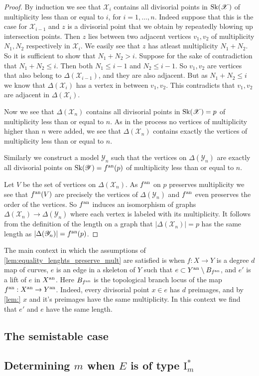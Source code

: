 \begin{proof}
	By induction we see that $\mathscr X_i$ contains all divisorial points in $\operatorname{Sk}(\mathscr X)$ of multiplicity less than or equal to $i$, for $i = 1, \ldots, n$. 
	Indeed suppose that this is the case for $\mathscr X_{i -1}$ and $z$ is a divisorial point that we obtain by repeatedly blowing up intersection points.
	Then  $z$ lies between two adjacent vertices $v_1, v_2$ of multiplicity $N_1, N_2$ respectively in $\mathscr X_{i}$. 
	We easily see that $z$ has atleast multiplicity $N_1 + N_2$. 
	So it is sufficient to show that $N_1 + N_2 > i$. 
	Suppose for the sake of contradiction that $N_1 + N_2 \le i$.
	Then both $N_1 \le i -1$ and $N_2 \le i-1$. 
	So $v_1, v_2$ are vertices that also belong to $\Delta(\mathscr X_{i-1})$, and they are also adjacent. 
	But as $N_1 + N_2 \le i$ we know that $\Delta(\mathscr X_{i})$ has a vertex in between $v_1, v_2$. This contradicts that $v_1, v_2$ are adjacent in $\Delta(\mathscr X_{i})$. 

	Now we see that $\Delta(\mathscr X_n)$ contains all divisorial points in $\operatorname{Sk}(\mathscr X) = p$ of multiplicity less than or equal to $n$. 
	As in the process no vertices of multiplicity higher than $n$ were added, we see that $\Delta(\mathscr X_n)$ contains exactly the vertices of multiplicity less than or equal to $n$. 

	Similarly we construct a model $\mathscr Y_n$ such that the vertices on  $\Delta(\mathscr Y_n)$ are exactly all divisorial points on $\operatorname{Sk}(\mathscr Y) = f{}^{\text{an}}(p)$ of multiplicity less than or equal to $n$. 

	Let $V$ be the set of vertices on $\Delta(\mathscr X_n)$. 
	As $f{}^{\text{an}} $ on $p$ preserves multiplicity we see that $f{}^{\text{an}}(V)$ are precisely the vertices of $\Delta(\mathscr Y_n)$ and $f{}^{\text{an}}$ even preserves the order of the vertices. 
	So $f{}^{\text{an}}$ induces an isomorphism of graphs $\Delta(\mathscr X_n) \to \Delta(\mathscr Y_n)$ where each vertex is labeled with its multiplicity. 
	It follows from the definition of the length on a graph that $|\Delta(\mathscr X_n)| = p$ has the same length as $|\Delta(\mathscr Y_n)| = f{}^{\text{an}}(p)$. 
\end{proof}

\begin{remark}
	The main context in which the assumptions of \cref{lem:equality_lenghts_preserve_mult} are satisfied is when $f:X \to Y$ is a degree $d$ map of curves, $e$ is an edge in a skeleton of $Y$ such that $e \subset Y{}^{\text{an}} \setminus B_{f{}^{\text{an}}}$, and $e'$ is a lift of $e$ in $X{}^{\text{an}}$. 
	Here $B_{f{}^{\text{an}}}$ is the topological branch locus of the map $f{}^{\text{an}}: X{}^{\text{an}} \to Y{}^{\text{an}}$.
	Indeed, every divisorial point $x \in e$ has $d$ preimages, and by \cref{lem:} $x$ and it's preimages have the same multiplicity. 
	In this context we find that $e'$ and $e$ have the same length. 
\end{remark}

\subsection{The semistable case} \label{sec:the_semistable_case}


\subsection{Determining $m$ when $E$ is of type $\mathrm I_m^*$} \label{sec:determining_m_when_e_is_of_type_ims$}




